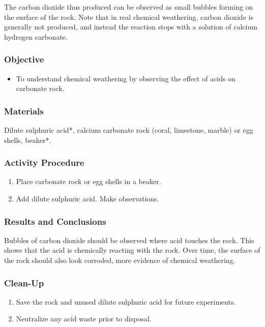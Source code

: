 \begin{center}
\end{center}

The carbon dioxide thus produced can be observed as small bubbles forming on the surface of the rock. Note that in real chemical weathering, carbon dioxide is generally not produced, and instead the reaction stops with a solution of calcium hydrogen carbonate.

\subsubsection{Objective}
\begin{itemize}
\item{To understand chemical weathering by observing the effect of acids on carbonate rock.}
\end{itemize}

\subsubsection{Materials}
Dilute sulphuric acid*, calcium carbonate rock (coral, limestone, marble) or egg shells, beaker*.

\subsubsection{Activity Procedure}
\begin{enumerate}
\item{Place carbonate rock or egg shells in a beaker.}
\item{Add dilute sulphuric acid. Make observations.}
\end{enumerate}

\subsubsection{Results and Conclusions}
Bubbles of carbon dioxide should be observed where acid touches the rock. This shows that the acid is chemically reacting with the rock. Over time, the surface of the rock should also look corroded, more evidence of chemical weathering.

\subsubsection{Clean-Up}
\begin{enumerate}
\item{Save the rock and unused dilute sulphuric acid for future experiments.}
\item{Neutralize any acid waste prior to disposal.}
\end{enumerate}

